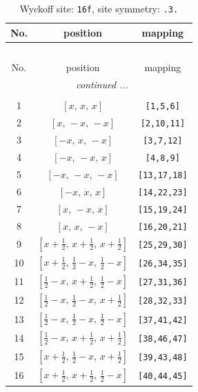 \documentclass[fleqn,8pt]{jsarticle}
\begin{document}
\begin{longtable}{ccc}
\caption{Wyckoff site: {\tt 16f}, site symmetry: {\tt .3.}}
 \\
 \hline \hline
No. & position & mapping \\ \hline \endfirsthead

\multicolumn{2}{l}{\tablename\ \thetable{}} \\
 \hline \hline
No. & position & mapping \\ \hline \endhead

 \hline \hline
\multicolumn{2}{r}{\footnotesize\it continued ...} \\ \endfoot

 \hline \hline
\multicolumn{2}{r}{} \\ \endlastfoot

1 & $\left[ x,\, x,\, x \right]$ & {\tt [1,5,6]} \\ \hline
2 & $\left[ x,\, - x,\, - x \right]$ & {\tt [2,10,11]} \\ \hline
3 & $\left[ - x,\, x,\, - x \right]$ & {\tt [3,7,12]} \\ \hline
4 & $\left[ - x,\, - x,\, x \right]$ & {\tt [4,8,9]} \\ \hline
5 & $\left[ - x,\, - x,\, - x \right]$ & {\tt [13,17,18]} \\ \hline
6 & $\left[ - x,\, x,\, x \right]$ & {\tt [14,22,23]} \\ \hline
7 & $\left[ x,\, - x,\, x \right]$ & {\tt [15,19,24]} \\ \hline
8 & $\left[ x,\, x,\, - x \right]$ & {\tt [16,20,21]} \\ \hline
9 & $\left[ x + \frac{1}{2},\, x + \frac{1}{2},\, x + \frac{1}{2} \right]$ & {\tt [25,29,30]} \\ \hline
10 & $\left[ x + \frac{1}{2},\, \frac{1}{2} - x,\, \frac{1}{2} - x \right]$ & {\tt [26,34,35]} \\ \hline
11 & $\left[ \frac{1}{2} - x,\, x + \frac{1}{2},\, \frac{1}{2} - x \right]$ & {\tt [27,31,36]} \\ \hline
12 & $\left[ \frac{1}{2} - x,\, \frac{1}{2} - x,\, x + \frac{1}{2} \right]$ & {\tt [28,32,33]} \\ \hline
13 & $\left[ \frac{1}{2} - x,\, \frac{1}{2} - x,\, \frac{1}{2} - x \right]$ & {\tt [37,41,42]} \\ \hline
14 & $\left[ \frac{1}{2} - x,\, x + \frac{1}{2},\, x + \frac{1}{2} \right]$ & {\tt [38,46,47]} \\ \hline
15 & $\left[ x + \frac{1}{2},\, \frac{1}{2} - x,\, x + \frac{1}{2} \right]$ & {\tt [39,43,48]} \\ \hline
16 & $\left[ x + \frac{1}{2},\, x + \frac{1}{2},\, \frac{1}{2} - x \right]$ & {\tt [40,44,45]} \\
\end{longtable}
\end{document}
